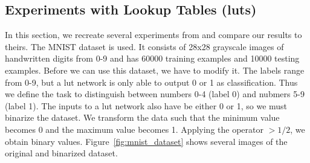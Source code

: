 \subsection{Experiments with Lookup Tables (luts)}
In this section, we recreate several experiments from \cite{chatterjee2018learning} and compare our results to theirs. The MNIST dataset \cite{mnist} is used. It consists of 28x28 grayscale images of handwritten digits from 0-9 and has 60000 training examples and 10000 testing examples. Before we can use this dataset, we have to modify it. The labels range from 0-9, but a lut network is only able to output 0 or 1 as classification. Thus we define the task to distinguish between numbers 0-4 (label 0) and nubmers 5-9 (label 1). The inputs to a lut network also have be either 0 or 1, so we must binarize the dataset. We transform the data such that the minimum value becomes 0 and the maximum value becomes 1. Applying the operator $>1/2$, we obtain binary values. Figure~\ref{fig:mnist_dataset} shows several images of the original and binarized dataset.

